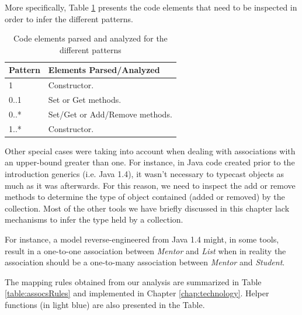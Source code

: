 More specifically, Table \ref{table:patternsElements} presents the code elements that need to be inspected in order to infer the different patterns.

\begin{table}
\caption{Code elements parsed and analyzed for the different patterns}
\label{table:patternsElements}
\centering
    \begin{tabular}{ll}
		\toprule
		\rowcolor[HTML]{BBDAFF}
        \textbf{Pattern}   & \textbf{Elements Parsed/Analyzed}   \\ 
        \hline
		1  &     Constructor. \\ 
		0..1 &  Set or Get methods. \\ 
		0..* &  Set/Get or Add/Remove methods.\\ 
		1..*  & Constructor.\\ 
        \hline
    \end{tabular}
\end{table}

Other special cases were taking into account when dealing with associations with an upper-bound greater than one. For instance, in Java code created prior to the introduction generics (i.e. Java 1.4), it wasn't necessary to typecast  objects as much as it was afterwards. For this reason, we need to inspect the add or remove methods to determine the type of object contained (added or removed) by the collection. Most of the other tools we have briefly discussed in this chapter lack mechanisms to infer the type held by a collection. 

For instance, a model reverse-engineered from Java 1.4 might, in some tools, result in a one-to-one association between \textit{Mentor} and \textit{List} when in reality the association should be a one-to-many association between \textit{Mentor} and \textit{Student}.

The mapping rules obtained from our analysis are summarized in Table \ref{table:assocsRules} and implemented in Chapter \ref{chap:technology}. Helper functions (in light blue) are also presented in the Table. 

